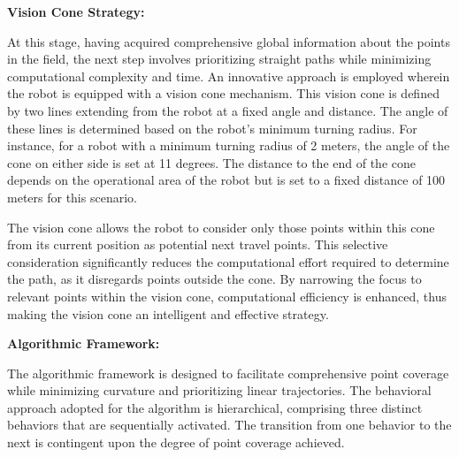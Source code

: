 \vspace*{6mm}  


\textbf{Vision Cone Strategy: }

\vspace*{6mm}  


At this stage, having acquired comprehensive global information about the points in the field, the next step involves prioritizing straight paths while minimizing computational complexity and time. An innovative approach is employed wherein the robot is equipped with a vision cone mechanism. This vision cone is defined by two lines extending from the robot at a fixed angle and distance. The angle of these lines is determined based on the robot's minimum turning radius. For instance, for a robot with a minimum turning radius of 2 meters, the angle of the cone on either side is set at 11 degrees. The distance to the end of the cone depends on the operational area of the robot but is set to a fixed distance of 100 meters for this scenario.

\vspace*{6mm}  


The vision cone allows the robot to consider only those points within this cone from its current position as potential next travel points. This selective consideration significantly reduces the computational effort required to determine the path, as it disregards points outside the cone. By narrowing the focus to relevant points within the vision cone, computational efficiency is enhanced, thus making the vision cone an intelligent and effective strategy.

\vspace*{6mm}  


\textbf{Algorithmic Framework: }


\vspace*{6mm}  

The algorithmic framework is designed to facilitate comprehensive point coverage while minimizing curvature and prioritizing linear trajectories. The behavioral approach adopted for the algorithm is hierarchical, comprising three distinct behaviors that are sequentially activated. The transition from one behavior to the next is contingent upon the degree of point coverage achieved.

